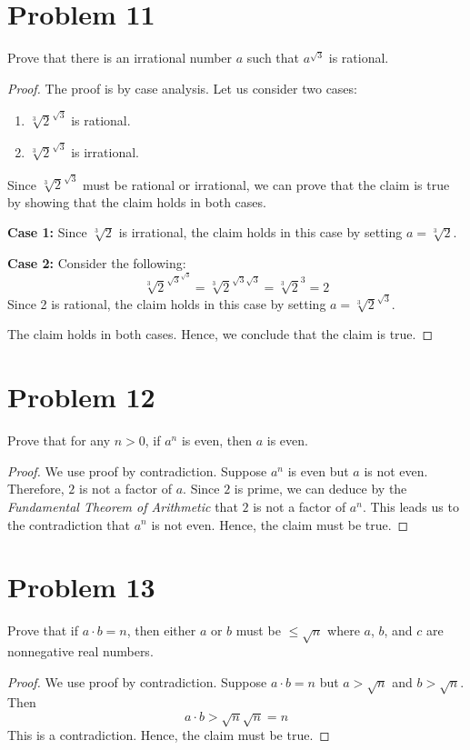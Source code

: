 \documentclass{article}
\begin{document}
\section{Problem 11}
Prove that there is an irrational number $a$ such that $a^{\sqrt{3}}$ is rational.
\begin{proof}
	The proof is by case analysis. Let us consider two cases:
	\begin{enumerate}
		\item $\sqrt[3]{2}^{\sqrt{3}}$ is rational.
		\item $\sqrt[3]{2}^{\sqrt{3}}$ is irrational.
	\end{enumerate}
	Since $\sqrt[3]{2}^{\sqrt{3}}$ must be rational or irrational, we can prove that the claim is true by showing that the claim holds in both cases.

	\textbf{Case 1:}
	Since $\sqrt[3]{2}$ is irrational, the claim holds in this case by setting $a = \sqrt[3]{2}$.

	\textbf{Case 2:}
	Consider the following:
	\[
		\sqrt[3]{2}^{{\sqrt{3}}^{\sqrt{3}}} = \sqrt[3]{2}^{\sqrt{3}\sqrt{3}} = \sqrt[3]{2}^3 = 2
	\]
	Since 2 is rational, the claim holds in this case by setting $a = \sqrt[3]{2}^{\sqrt{3}}$.

	The claim holds in both cases. Hence, we conclude that the claim is true.
\end{proof}

\pagebreak
\section{Problem 12}
Prove that for any $n > 0$, if $a^n$ is even, then $a$ is even.
\begin{proof}
	We use proof by contradiction. Suppose $a^n$ is even but $a$ is not even. Therefore, $2$ is not a factor of $a$. Since $2$ is prime, we can deduce by the \textit{Fundamental Theorem of Arithmetic} that $2$ is not a factor of $a^n$. This leads us to the contradiction that $a^n$ is not even. Hence, the claim must be true.
\end{proof}

\pagebreak
\section{Problem 13}
Prove that if $a \cdot b = n$, then either $a$ or $b$ must be $\leq \sqrt{n}$ where $a$, $b$, and $c$ are nonnegative real numbers.
\begin{proof}
	We use proof by contradiction. Suppose $a \cdot b = n$ but $a > \sqrt{n}$ and $b > \sqrt{n}$. Then
	\[
		a \cdot b > \sqrt{n}\sqrt{n} = n
	\]
	This is a contradiction. Hence, the claim must be true.
\end{proof}
\end{document}
